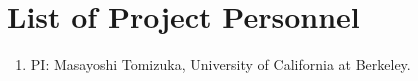 \renewcommand{\thepage}{\arabic{page}}
\section{List of Project Personnel}
\vspace{20pt}

\begin{enumerate}
\item PI: Masayoshi Tomizuka, University of California at Berkeley.
\end{enumerate}

